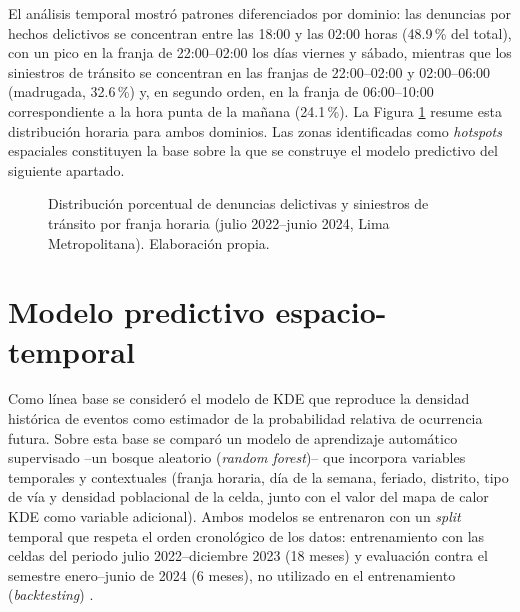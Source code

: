 El an\'alisis temporal mostr\'o patrones diferenciados por dominio: las denuncias por hechos delictivos se concentran entre las 18:00 y las 02:00 horas (48.9\,\% del total), con un pico en la franja de 22:00--02:00 los d\'ias viernes y s\'abado, mientras que los siniestros de tr\'ansito se concentran en las franjas de 22:00--02:00 y 02:00--06:00 (madrugada, 32.6\,\%) y, en segundo orden, en la franja de 06:00--10:00 correspondiente a la hora punta de la ma\~nana (24.1\,\%). La Figura \ref{fig:franjas} resume esta distribuci\'on horaria para ambos dominios. Las zonas identificadas como \textit{hotspots} espaciales constituyen la base sobre la que se construye el modelo predictivo del siguiente apartado.

\begin{figure}[H]
\centering
{}
\caption[Distribuci\'on horaria de los eventos]{Distribuci\'on porcentual de denuncias delictivas y siniestros de tr\'ansito por franja horaria (julio 2022--junio 2024, Lima Metropolitana). Elaboraci\'on propia.}
\label{fig:franjas}
\end{figure}

\section{Modelo predictivo espacio-temporal}

Como l\'inea base se consider\'o el modelo de KDE que reproduce la densidad hist\'orica de eventos como estimador de la probabilidad relativa de ocurrencia futura. Sobre esta base se compar\'o un modelo de aprendizaje autom\'atico supervisado --un bosque aleatorio (\textit{random forest})-- que incorpora variables temporales y contextuales (franja horaria, d\'ia de la semana, feriado, distrito, tipo de v\'ia y densidad poblacional de la celda, junto con el valor del mapa de calor KDE como variable adicional). Ambos modelos se entrenaron con un \textit{split} temporal que respeta el orden cronol\'ogico de los datos: entrenamiento con las celdas del periodo julio 2022--diciembre 2023 (18 meses) y evaluaci\'on contra el semestre enero--junio de 2024 (6 meses), no utilizado en el entrenamiento (\textit{backtesting}) \citep{perry2013predictive}.

